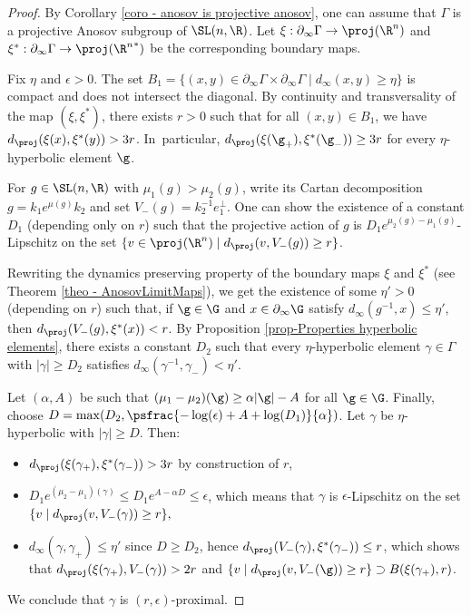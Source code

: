 \begin{proof}
By Corollary \ref{coro - anosov is projective anosov}, one can assume that $\Gamma$ is a projective Anosov subgroup of $\SL(n,\R)$. Let $\xi:\partial_\infty \Gamma \to \proj(\R^n)$ and $\xi^*: \partial_\infty \Gamma \to \proj({\R^n}^*)$ be the corresponding boundary maps.

Fix $\eta$ and $\epsilon>0$. The set $ B_1 =\{(x,y)\in \partial_\infty \Gamma \times \partial_\infty \Gamma \mid d_\infty(x,y) \geq \eta\}$ is compact and does not intersect the diagonal. By continuity and transversality of the map $(\xi,\xi^*)$, there exists $r>0$ such that for all $(x,y)\in B_1$, we have $d_\proj(\xi(x), \xi^*(y))> 3r$. In~particular, $d_\proj(\xi(\g_+), \xi^*(\g_-)) \geq 3r$ for every $\eta$-hyperbolic element $\g$.

For $g\in \SL(n,\R)$ with $\mu_1(g) > \mu_2(g)$, write its Cartan decomposition $g= k_1 e^{\mu(g)} k_2$ and set $V_-(g) = k_2^{-1}e_1^\perp$. One can show the existence of a constant $D_1$ (depending only on $r$) such that the projective action of $g$ is $D_1 e^{\mu_2(g)-\mu_1(g)}$-Lipschitz on the set $\{v \in \proj(\R^n) \mid d_\proj(v, V_-(g)) \geq r\}$.

Rewriting the dynamics preserving property of the boundary maps $\xi$ and $\xi^*$ (see Theorem \ref{theo - AnosovLimitMaps}), we get the existence of some $\eta'>0$ (depending on $r$) such that, if $\g \in \G$ and $x\in \partial_\infty \G$ satisfy $d_\infty (g^{-1},x)\leq \eta'$, then $d_\proj(V_-(g), \xi^*(x)) < r$. By Proposition \ref{prop-Properties hyperbolic elements}, there exists a constant $D_2$ such that every $\eta$-hyperbolic element $\gamma \in \Gamma$ with $\vert \gamma \vert \geq D_2$ satisfies $d_\infty(\gamma^{-1},\gamma_-) <\eta'$.

Let $(\alpha, A)$ be such that $(\mu_1-\mu_2)(\g)\geq \alpha \vert \g \vert -A$ for all $\g\in\G$. Finally, choose $D = \max(D_2,\psfrac{-\log(\epsilon)+A+\log(D_1)}{\alpha})$. Let $\gamma$ be $\eta$-hyperbolic with $\vert \gamma \vert \geq D$. Then:
\begin{itemize}
\item $d_\proj(\xi(\gamma_+),\xi^*(\gamma_-)) > 3r$ by construction of $r$,

\item $D_1 e^{(\mu_2-\mu_1)(\gamma)} \leq D_1 e^{A-\alpha D}\leq \epsilon$, which means that $\gamma$ is $\epsilon$-Lipschitz on the set $\{v\mid d_\proj (v, V_-(\gamma))\geq r\},$
\item $d_\infty(\gamma, \gamma_+) \leq \eta'$ since $D\geq D_2$, hence $d_\proj(V_-(\gamma), \xi^*(\gamma_-)) \leq r$, which shows that $d_\proj(\xi(\gamma_+), V_-(\gamma))>2r$ and $\{v\mid d_\proj(v, V_-(\g))\geq r\} \supset B(\xi(\gamma_+),r)$.
\end{itemize}
We conclude that $\gamma$ is $(r,\epsilon)$-proximal.


\end{proof}
